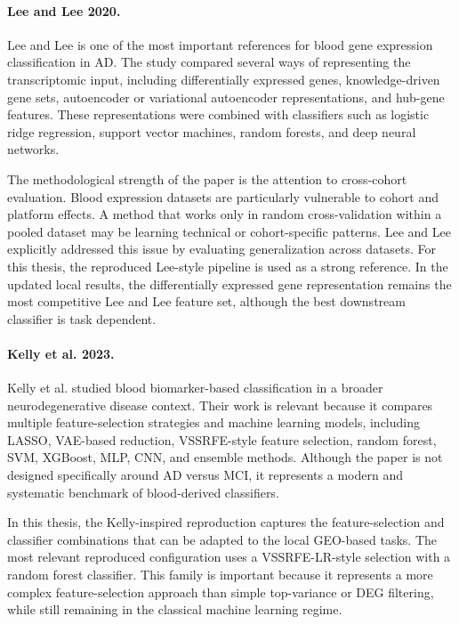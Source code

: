 \paragraph{Lee and Lee 2020.}
Lee and Lee \cite{lee2020prediction} is one of the most important references for blood gene expression classification in AD. The study compared several ways of representing the transcriptomic input, including differentially expressed genes, knowledge-driven gene sets, autoencoder or variational autoencoder representations, and hub-gene features. These representations were combined with classifiers such as logistic ridge regression, support vector machines, random forests, and deep neural networks.

The methodological strength of the paper is the attention to cross-cohort evaluation. Blood expression datasets are particularly vulnerable to cohort and platform effects. A method that works only in random cross-validation within a pooled dataset may be learning technical or cohort-specific patterns. Lee and Lee explicitly addressed this issue by evaluating generalization across datasets. For this thesis, the reproduced Lee-style pipeline is used as a strong reference. In the updated local results, the differentially expressed gene representation remains the most competitive Lee and Lee feature set, although the best downstream classifier is task dependent.

\paragraph{Kelly et al. 2023.}
Kelly et al. \cite{kelly2023blood} studied blood biomarker-based classification in a broader neurodegenerative disease context. Their work is relevant because it compares multiple feature-selection strategies and machine learning models, including LASSO, VAE-based reduction, VSSRFE-style feature selection, random forest, SVM, XGBoost, MLP, CNN, and ensemble methods. Although the paper is not designed specifically around AD versus MCI, it represents a modern and systematic benchmark of blood-derived classifiers.

In this thesis, the Kelly-inspired reproduction captures the feature-selection and classifier combinations that can be adapted to the local GEO-based tasks. The most relevant reproduced configuration uses a VSSRFE-LR-style selection with a random forest classifier. This family is important because it represents a more complex feature-selection approach than simple top-variance or DEG filtering, while still remaining in the classical machine learning regime.

